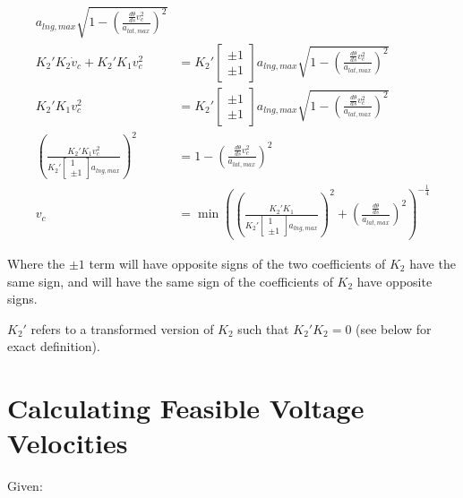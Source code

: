 \documentclass{article}
\begin{document}
\begin{align*}
   a_{lng, max} \sqrt{1 - \left(\frac{\frac{d\theta}{ds}v_c^2}{a_{lat,max}}\right)^2} \\
K_2' K_2 \dot{v}_c + K_2' K_1 v_c^2
&= K_2' \begin{bmatrix}\pm 1 \\ \pm 1\end{bmatrix}
   a_{lng, max} \sqrt{1 - \left(\frac{\frac{d\theta}{ds}v_c^2}{a_{lat,max}}\right)^2} \\
K_2' K_1 v_c^2
&= K_2' \begin{bmatrix}\pm 1 \\ \pm 1\end{bmatrix}
   a_{lng, max} \sqrt{1 - \left(\frac{\frac{d\theta}{ds}v_c^2}{a_{lat,max}}\right)^2} \\
\left(\frac{K_2' K_1 v_c^2}{K_2' \begin{bmatrix} 1 \\ \pm 1\end{bmatrix}a_{lng,max}}\right)^2
&= 1 - \left(\frac{\frac{d\theta}{ds}v_c^2}{a_{lat,max}}\right)^2 \\
v_c &= \min \left(
\left(\frac{K_2'K_1}{K_2' \begin{bmatrix} 1 \\ \pm 1\end{bmatrix}a_{lng, max}}\right)^2 +
   \left(\frac{\frac{d\theta}{ds}}{a_{lat,max}}\right)^2
  \right)^{-\frac14}
\end{align*}

Where the $\pm 1$ term will have opposite signs of the two coefficients of
$K_2$ have the same sign, and will have the same sign of the coefficients of
$K_2$ have opposite signs.

$K_2'$ refers to a transformed version of $K_2$ such that $K_2'K_2 = 0$ (see
below for exact definition).

\section{Calculating Feasible Voltage Velocities}

Given:
\end{document}
